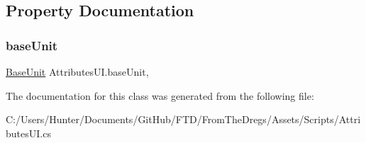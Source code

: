 \subsection{Property Documentation}
\mbox{\label{class_attributes_u_i_a346e8b850f9b6c18b78fc7175d89bea7}} 
\subsubsection{\texorpdfstring{baseUnit}{baseUnit}}
{\footnotesize\ttfamily \mbox{\hyperlink{class_base_unit}{Base\+Unit}} Attributes\+U\+I.\+base\+Unit\hspace{0.3cm}{\ttfamily [get]}, {\ttfamily [set]}}



The documentation for this class was generated from the following file\+:\begin{DoxyCompactItemize}
\item 
C\+:/\+Users/\+Hunter/\+Documents/\+Git\+Hub/\+F\+T\+D/\+From\+The\+Dregs/\+Assets/\+Scripts/Attributes\+U\+I.\+cs\end{DoxyCompactItemize}
